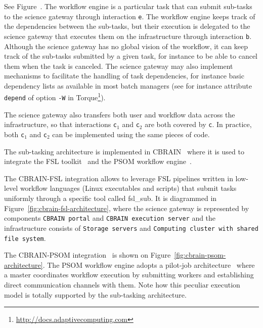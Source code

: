 \documentclass[preprint,3p,twocolumn]{elsarticle}
\begin{document}
See Figure~. The workflow engine is a particular
task that can submit sub-tasks to the science gateway through
interaction \texttt{e}. The workflow engine keeps track of the
dependencies between the sub-tasks, but their execution is delegated to
the science gateway that executes them on the infrastructure through
interaction \texttt{b}. Although the science gateway has no global
vision of the workflow, it can keep track of the sub-tasks submitted
by a given task, for instance to be able to cancel them when the task
is canceled. The science gateway may also implement mechanisms to
facilitate the handling of task dependencies, for instance basic
dependency lists as available in most batch managers (see for instance
attribute \texttt{depend} of option \texttt{-W} in
Torque\footnote{\url{http://docs.adaptivecomputing.com}}).

The science gateway also transfers both user and workflow data across
the infrastructure, so that interactions \texttt{c$_1$} and
\texttt{c$_2$} are both covered by \texttt{c}. In practice, both
\texttt{c$_1$} and \texttt{c$_2$} can be implemented using the same
pieces of code.

The sub-tasking architecture is implemented in CBRAIN~\cite{SHER-14}
where it is used to integrate the FSL toolkit~\cite{Jenkinson2012782}
and the PSOM workflow engine~\cite{bellec2012pipeline}.

The CBRAIN-FSL integration allows to leverage FSL pipelines written in
low-level workflow languages (Linux executables and scripts) that
submit tasks uniformly through a specific tool called fsl\_sub. It is
diagrammed in Figure~\ref{fig:cbrain-fsl-architecture}, where the
science gateway is represented by components \texttt{CBRAIN portal}
and \texttt{CBRAIN execution server} and the infrastructure consists
of \texttt{Storage servers} and \texttt{Computing cluster with shared
  file system}.

The CBRAIN-PSOM integration~\cite{GLAT-16} is shown on
Figure~\ref{fig:cbrain-psom-architecture}. The PSOM workflow engine
adopts a pilot-job architecture~\cite{turilli2015comprehensive} where
a master coordinates workflow execution by submitting workers and
establishing direct communication channels with them. Note how this
peculiar execution model is totally supported by the sub-tasking
architecture.
\end{document}
